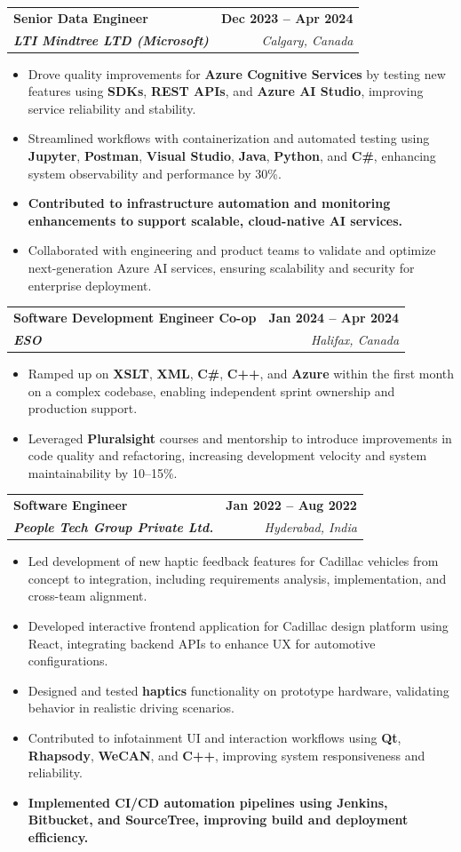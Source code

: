 \documentclass[letterpaper,11pt]{article}
\makeatletter
\newcommand{\resumeItem}[1]{
  \item\small{
    {#1 \vspace{-2pt}}
  }
}
\newcommand{\resumeSubheading}[4]{
  \vspace{-2pt}\item
    \begin{tabular*}{1.0\textwidth}[t]{l@{\extracolsep{\fill}}r}
      \textbf{#1} & \textbf{\small #2} \\
      \textit{\small#3} & \textit{\small #4} \\
    \end{tabular*}\vspace{-7pt}
}
\newcommand{\resumeItemListStart}{\begin{itemize}}
\newcommand{\resumeItemListEnd}{\end{itemize}\vspace{-5pt}}
\makeatother
\begin{document}
    \resumeSubheading
      {\textbf{Senior Data Engineer}}{\textbf{Dec 2023 -- Apr 2024}}
      {\textbf{LTI Mindtree LTD (Microsoft)}}{Calgary, Canada}
      \resumeItemListStart
        \resumeItem{Drove quality improvements for \textbf{Azure Cognitive Services} by testing new features using \textbf{SDKs}, \textbf{REST APIs}, and \textbf{Azure AI Studio}, improving service reliability and stability.}
        \resumeItem{Streamlined workflows with containerization and automated testing using \textbf{Jupyter}, \textbf{Postman}, \textbf{Visual Studio}, \textbf{Java}, \textbf{Python}, and \textbf{C\#}, enhancing system observability and performance by 30\%.}
        \resumeItem{\textbf{Contributed to infrastructure automation and monitoring enhancements to support scalable, cloud-native AI services.}}
        \resumeItem{Collaborated with engineering and product teams to validate and optimize next-generation Azure AI services, ensuring scalability and security for enterprise deployment.}
      \resumeItemListEnd
    
    \resumeSubheading
      {\textbf{Software Development Engineer Co-op}}{\textbf{Jan 2024 -- Apr 2024}}
      {\textbf{ESO}}{Halifax, Canada}
      \resumeItemListStart
        \resumeItem{Ramped up on \textbf{XSLT}, \textbf{XML}, \textbf{C\#}, \textbf{C++}, and \textbf{Azure} within the first month on a complex codebase, enabling independent sprint ownership and production support.}
        \resumeItem{Leveraged \textbf{Pluralsight} courses and mentorship to introduce improvements in code quality and refactoring, increasing development velocity and system maintainability by 10--15\%.}
      \resumeItemListEnd

    \resumeSubheading
      {\textbf{Software Engineer}}{\textbf{Jan 2022 -- Aug 2022}}
      {\textbf{People Tech Group Private Ltd.}}{Hyderabad, India}
      \resumeItemListStart
        \resumeItem{Led development of new haptic feedback features for Cadillac vehicles from concept to integration, including requirements analysis, implementation, and cross-team alignment.}
        \resumeItem{Developed interactive frontend application for Cadillac design platform using React, integrating backend APIs to enhance UX for automotive configurations.}
        \resumeItem{Designed and tested \textbf{haptics} functionality on prototype hardware, validating behavior in realistic driving scenarios.}
        \resumeItem{Contributed to infotainment UI and interaction workflows using \textbf{Qt}, \textbf{Rhapsody}, \textbf{WeCAN}, and \textbf{C++}, improving system responsiveness and reliability.}
        \resumeItem{\textbf{Implemented CI/CD automation pipelines using Jenkins, Bitbucket, and SourceTree, improving build and deployment efficiency.}}
      \resumeItemListEnd
\end{document}
